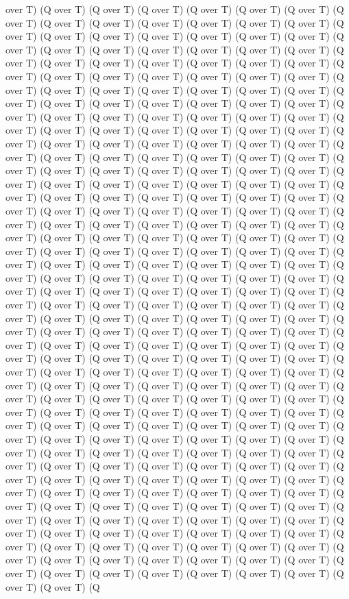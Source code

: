 over T) (Q over T) (Q over T) (Q over T) (Q over T) (Q over T) (Q over T) (Q over T) (Q over T) (Q over T) (Q over T) (Q over T) (Q over T) (Q over T) (Q over T) (Q over T) (Q over T) (Q over T) (Q over T) (Q over T) (Q over T) (Q over T) (Q over T) (Q over T) (Q over T) (Q over T) (Q over T) (Q over T) (Q over T) (Q over T) (Q over T) (Q over T) (Q over T) (Q over T) (Q over T) (Q over T) (Q over T) (Q over T) (Q over T) (Q over T) (Q over T) (Q over T) (Q over T) (Q over T) (Q over T) (Q over T) (Q over T) (Q over T) (Q over T) (Q over T) (Q over T) (Q over T) (Q over T) (Q over T) (Q over T) (Q over T) (Q over T) (Q over T) (Q over T) (Q over T) (Q over T) (Q over T) (Q over T) (Q over T) (Q over T) (Q over T) (Q over T) (Q over T) (Q over T) (Q over T) (Q over T) (Q over T) (Q over T) (Q over T) (Q over T) (Q over T) (Q over T) (Q over T) (Q over T) (Q over T) (Q over T) (Q over T) (Q over T) (Q over T) (Q over T) (Q over T) (Q over T) (Q over T) (Q over T) (Q over T) (Q over T) (Q over T) (Q over T) (Q over T) (Q over T) (Q over T) (Q over T) (Q over T) (Q over T) (Q over T) (Q over T) (Q over T) (Q over T) (Q over T) (Q over T) (Q over T) (Q over T) (Q over T) (Q over T) (Q over T) (Q over T) (Q over T) (Q over T) (Q over T) (Q over T) (Q over T) (Q over T) (Q over T) (Q over T) (Q over T) (Q over T) (Q over T) (Q over T) (Q over T) (Q over T) (Q over T) (Q over T) (Q over T) (Q over T) (Q over T) (Q over T) (Q over T) (Q over T) (Q over T) (Q over T) (Q over T) (Q over T) (Q over T) (Q over T) (Q over T) (Q over T) (Q over T) (Q over T) (Q over T) (Q over T) (Q over T) (Q over T) (Q over T) (Q over T) (Q over T) (Q over T) (Q over T) (Q over T) (Q over T) (Q over T) (Q over T) (Q over T) (Q over T) (Q over T) (Q over T) (Q over T) (Q over T) (Q over T) (Q over T) (Q over T) (Q over T) (Q over T) (Q over T) (Q over T) (Q over T) (Q over T) (Q over T) (Q over T) (Q over T) (Q over T) (Q over T) (Q over T) (Q over T) (Q over T) (Q over T) (Q over T) (Q over T) (Q over T) (Q over T) (Q over T) (Q over T) (Q over T) (Q over T) (Q over T) (Q over T) (Q over T) (Q over T) (Q over T) (Q over T) (Q over T) (Q over T) (Q over T) (Q over T) (Q over T) (Q over T) (Q over T) (Q over T) (Q over T) (Q over T) (Q over T) (Q over T) (Q over T) (Q over T) (Q over T) (Q over T) (Q over T) (Q over T) (Q over T) (Q over T) (Q over T) (Q over T) (Q over T) (Q over T) (Q over T) (Q over T) (Q over T) (Q over T) (Q over T) (Q over T) (Q over T) (Q over T) (Q over T) (Q over T) (Q over T) (Q over T) (Q over T) (Q over T) (Q over T) (Q over T) (Q over T) (Q over T) (Q over T) (Q over T) (Q over T) (Q over T) (Q over T) (Q over T) (Q over T) (Q over T) (Q over T) (Q over T) (Q over T) (Q over T) (Q over T) (Q over T) (Q over T) (Q over T) (Q over T) (Q over T) (Q over T) (Q over T) (Q over T) (Q over T) (Q over T) (Q over T) (Q over T) (Q over T) (Q over T) (Q over T) (Q over T) (Q over T) (Q over T) (Q over T) (Q over T) (Q over T) (Q over T) (Q over T) (Q over T) (Q over T) (Q over T) (Q over T) (Q over T) (Q over T) (Q over T) (Q over T) (Q over T) (Q over T) (Q over T) (Q over T) (Q over T) (Q over T) (Q over T) (Q over T) (Q over T) (Q over T) (Q over T) (Q over T) (Q over T) (Q over T) (Q over T) (Q over T) (Q over T) (Q over T) (Q over T) (Q over T) (Q over T) (Q over T) (Q over T) (Q 